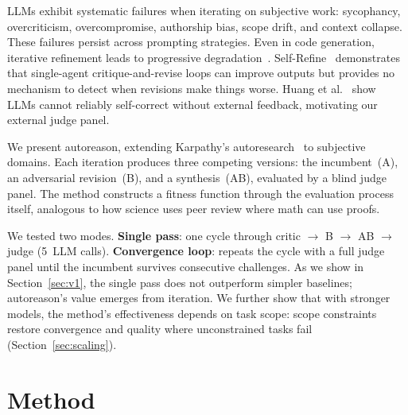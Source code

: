 \documentclass[10pt,twocolumn]{article}
\begin{document}
LLMs exhibit systematic failures when iterating on subjective work: sycophancy, overcriticism, overcompromise, authorship bias, scope drift, and context collapse. These failures persist across prompting strategies. Even in code generation, iterative refinement leads to progressive degradation~\cite{slopcodebench}. Self-Refine~\cite{selfrefine} demonstrates that single-agent critique-and-revise loops can improve outputs but provides no mechanism to detect when revisions make things worse. Huang et al.~\cite{huang2023} show LLMs cannot reliably self-correct without external feedback, motivating our external judge panel.

We present autoreason, extending Karpathy's autoresearch~\cite{autoresearch} to subjective domains. Each iteration produces three competing versions: the incumbent~(A), an adversarial revision~(B), and a synthesis~(AB), evaluated by a blind judge panel. The method constructs a fitness function through the evaluation process itself, analogous to how science uses peer review where math can use proofs.

We tested two modes. \textbf{Single pass}: one cycle through critic $\to$ B $\to$ AB $\to$ judge (5~LLM calls). \textbf{Convergence loop}: repeats the cycle with a full judge panel until the incumbent survives consecutive challenges. As we show in Section~\ref{sec:v1}, the single pass does not outperform simpler baselines; autoreason's value emerges from iteration. We further show that with stronger models, the method's effectiveness depends on task scope: scope constraints restore convergence and quality where unconstrained tasks fail (Section~\ref{sec:scaling}).

\section{Method}
\end{document}
